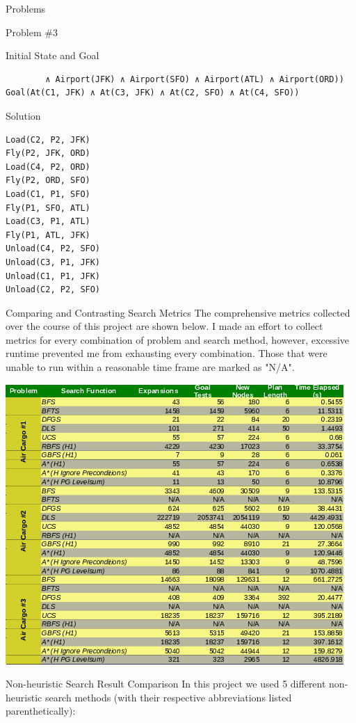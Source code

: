 \documentclass{article}
\begin{document}
\begin{section}{Problems}
\begin{subsection}{Problem \#3}
\begin{subsubsection}{Initial State and Goal}
\begin{verbatim}
		∧ Airport(JFK) ∧ Airport(SFO) ∧ Airport(ATL) ∧ Airport(ORD))
Goal(At(C1, JFK) ∧ At(C3, JFK) ∧ At(C2, SFO) ∧ At(C4, SFO))
\end{verbatim}
\end{subsubsection}
\begin{subsubsection}{Solution}
	\begin{verbatim}
Load(C2, P2, JFK)
Fly(P2, JFK, ORD)
Load(C4, P2, ORD)
Fly(P2, ORD, SFO)
Load(C1, P1, SFO)
Fly(P1, SFO, ATL)
Load(C3, P1, ATL)
Fly(P1, ATL, JFK)
Unload(C4, P2, SFO)
Unload(C3, P1, JFK)
Unload(C1, P1, JFK)
Unload(C2, P2, SFO)
	\end{verbatim}
\end{subsubsection}
\end{subsection}
\end{section}
\begin{section}{Comparing and Contrasting Search Metrics}
	The comprehensive metrics collected over the course of this project are shown below. I made an effort to
	collect metrics for every combination of problem and search method, however, excessive runtime prevented me from exhausting
	every combination. Those that were unable to run within a reasonable time frame are marked as "N/A".\par
\includegraphics[width=\textwidth]{heuristics}
\begin{subsection}{Non-heuristic Search Result Comparison}
	In this project we used 5 different non-heuristic search methods (with their respective abbreviations listed parenthetically):
	\begin{itemize}

\end{itemize}
\end{subsection}
\end{section}
\end{document}
